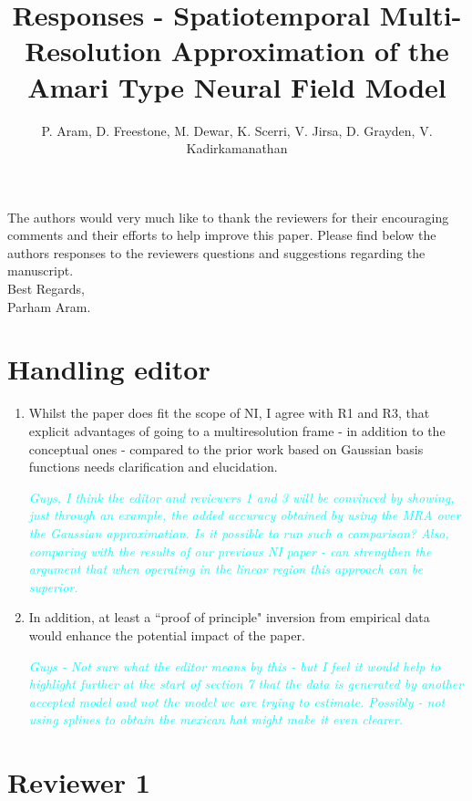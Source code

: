 \documentclass{article}
\title{Responses - Spatiotemporal Multi-Resolution Approximation of the Amari Type Neural Field Model}
\author{ P. Aram, D. Freestone, M. Dewar, K. Scerri, V. Jirsa, D. Grayden, V. Kadirkamanathan}
\newcommand{\ken}[1]{\textcolor{cyan}{#1}}
\begin{document}
    \maketitle

    The authors would very much like to thank the reviewers for their encouraging comments and their efforts to help improve this paper. Please find below the authors responses to the reviewers questions and suggestions regarding the manuscript. 
\\

Best Regards,
\\

Parham Aram.

\section{Handling editor}
\begin{enumerate}
\item Whilst the paper does fit the scope of NI, I agree with R1 and R3, that explicit advantages of going to a multiresolution frame - in addition to the conceptual ones - compared to the prior work based on Gaussian basis functions needs clarification and elucidation. 

\emph{\ken{Guys, I think the editor and reviewers 1 and 3 will be convinced by showing, just through an example, the added accuracy obtained by using the MRA over the Gaussian approximation. Is it possible to run such a comparison? Also, comparing with the results of our previous NI paper - can strengthen the argument that when operating in the linear region this approach can be superior.}}

\item  In addition, at least a ``proof of principle" inversion from empirical data would enhance the potential impact of the paper. 

\emph{\ken{Guys - Not sure what the editor means by this - but I feel it would help to highlight further at the start of section 7 that the data is generated by another accepted model and not the model we are trying to estimate. Possibly - not using splines to obtain the mexican hat might make it even clearer.}}
	
\end{enumerate}

    \section{Reviewer 1}
    
\end{document}

